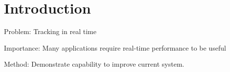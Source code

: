 \section{Introduction}
\label{sec:intro}

Problem: Tracking in real time

Importance: Many applications require real-time performance to be useful

Method: Demonstrate capability to improve current system.